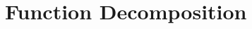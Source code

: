 \documentclass[paper]{ieice}
\providecommand{\DIFaddbegin}{} %
\providecommand{\DIFaddend}{} %
\newcommand{\DIFaddincludegraphics}[2][]{{\color{blue}\fbox{\DIFOincludegraphics[#1]{#2}}}} %
\DeclareRobustCommand{\DIFaddbegin}{\DIFOaddbegin \let\includegraphics\DIFaddincludegraphics} %
\DeclareRobustCommand{\DIFaddend}{\DIFOaddend \let\includegraphics\DIFOincludegraphics} %
\begin{document}
\appendix
\DIFaddbegin \newcommand{\thenewsection}{\Alph{section}}
\renewcommand\thefigure{\thenewsection\arabic{figure}}
\DIFaddend 

\section{Function Decomposition}
\label{App:FuncDecomp}
\begin{figure}[h]
  \centering
  \scalebox{0.8}{%
\Qcircuit @C=0.5em @R=0.2em { \\
                            &          &           &          &                    &                    &           &           &                    &          &                             &                    & \ustick{x_3 \cdot F(x_3=1,x_2,x_1)}   &                    &                    &          &            &                    &           &          &          &                    &          &           &          &                    & \\
          \push{\ket{x_1}}  & \qw      & \qw       & \qw      & \qw                & \qw                & \qw       & \qw       & \qw                & \ctrl{3} & \qw                         & \qw                & \qw                                   & \ctrl{3}           & \qw                & \qw      & \qw        & \qw                & \qw       & \qw      & \qw      & \qw                & \ctrl{3} & \qw       & \qw      & \qw                & \ctrl{3} & \qw & \cdots  \\
          \push{\ket{x_2}}  & \qw      & \qw       & \qw      & \qw                & \qw                & \qw       & \ctrl{2}  & \qw                & \qw      & \qw                         & \ctrl{2}           & \qw                                   & \qw                & \qw                & \qw      & \qw        & \qw                & \qw       & \qw      & \ctrl{2} & \qw                & \qw      & \qw       & \ctrl{2} & \qw                & \qw      & \qw & \cdots  \\
          \push{\ket{x_3}}  & \qw      & \qw       & \ctrl{1} & \qw                & \qw                & \qw       & \qw       & \qw                & \qw      & \qw                         & \qw                & \qw                                   & \qw                & \qw                & \qw      & \ctrl{1}   & \qw                & \qw       & \qw      & \qw      & \qw                & \qw      & \qw       & \qw      & \qw                & \qw      & \qw & \cdots  \\
}}
\end{figure}
\end{document}
